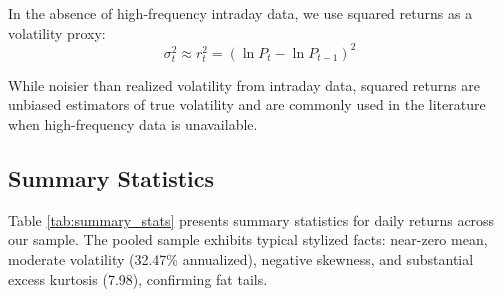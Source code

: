 \documentclass[12pt,a4paper]{article}
\begin{document}
In the absence of high-frequency intraday data, we use squared returns as a volatility proxy:
\begin{equation}
    \sigma_t^2 \approx r_t^2 = (\ln P_t - \ln P_{t-1})^2
\end{equation}

While noisier than realized volatility from intraday data, squared returns are unbiased estimators of true volatility and are commonly used in the literature when high-frequency data is unavailable.

\subsection{Summary Statistics}

Table \ref{tab:summary_stats} presents summary statistics for daily returns across our sample. The pooled sample exhibits typical stylized facts: near-zero mean, moderate volatility (32.47\% annualized), negative skewness, and substantial excess kurtosis (7.98), confirming fat tails.
\end{document}
